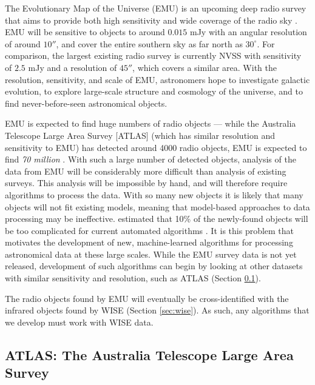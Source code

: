             The Evolutionary Map of the Universe (EMU) is an upcoming deep radio
            survey that aims to provide both high sensitivity and wide coverage
            of the radio sky \citep{norris11}. EMU will be sensitive to objects
            to around $0.015$ mJy with an angular resolution of around $10''$,
            and cover the entire southern sky as far north as $30^\circ$. For
            comparison, the largest existing radio survey is currently NVSS
            \citep{condon98} with sensitivity of $2.5$ mJy and a resolution of
            $45''$, which covers a similar area. With the resolution,
            sensitivity, and scale of EMU, astronomers hope to investigate
            galactic evolution, to explore large-scale structure and cosmology
            of the universe, and to find never-before-seen astronomical objects.

            EMU is expected to find huge numbers of radio objects --- while the
            Australia Telescope Large Area Survey [ATLAS] (which has similar
            resolution and sensitivity to EMU) has detected around 4000 radio
            objects, EMU is expected to find \emph{70 million}
            \citep{banfield15}. With such a large number of detected objects,
            analysis of the data from EMU will be considerably more difficult
            than analysis of existing surveys. This analysis will be impossible
            by hand, and will therefore require algorithms to process the data.
            With so many new objects it is likely that many objects will not fit
            existing models, meaning that model-based approaches to data
            processing may be ineffective. \citet{norris11} estimated that 10\%
            of the newly-found objects will be too complicated for current
            automated algorithms \citep{banfield15}. It is this problem that
            motivates the development of new, machine-learned algorithms for
            processing astronomical data at these large scales. While the EMU
            survey data is not yet released, development of such algorithms can
            begin by looking at other datasets with similar sensitivity and
            resolution, such as ATLAS (Section \ref{sec:atlas}).

            The radio objects found by EMU will eventually be cross-identified
            with the infrared objects found by WISE (Section \ref{sec:wise}). As
            such, any algorithms that we develop must work with WISE data.

        \subsection{ATLAS: The Australia Telescope Large Area Survey}
        \label{sec:atlas}

